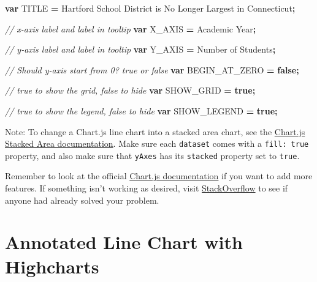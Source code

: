 \documentclass[
  english,
]{book}
\newenvironment{Shaded}{\begin{snugshade}}{\end{snugshade}}
\newcommand{\CommentTok}[1]{\textcolor[rgb]{0.56,0.35,0.01}{\textit{#1}}}
\newcommand{\KeywordTok}[1]{\textcolor[rgb]{0.13,0.29,0.53}{\textbf{#1}}}
\newcommand{\NormalTok}[1]{#1}
\newcommand{\OperatorTok}[1]{\textcolor[rgb]{0.81,0.36,0.00}{\textbf{#1}}}
\newcommand{\StringTok}[1]{\textcolor[rgb]{0.31,0.60,0.02}{#1}}
\begin{document}
\begin{Shaded}
\begin{Highlighting}[]
\KeywordTok{var}\NormalTok{ TITLE }\OperatorTok{=} \StringTok{\textquotesingle{}Hartford School District is No Longer Largest in Connecticut\textquotesingle{}}\OperatorTok{;}

\CommentTok{// x{-}axis label and label in tooltip}
\KeywordTok{var}\NormalTok{ X\_AXIS }\OperatorTok{=} \StringTok{\textquotesingle{}Academic Year\textquotesingle{}}\OperatorTok{;}

\CommentTok{// y{-}axis label and label in tooltip}
\KeywordTok{var}\NormalTok{ Y\_AXIS }\OperatorTok{=} \StringTok{\textquotesingle{}Number of Students\textquotesingle{}}\OperatorTok{;}

\CommentTok{// Should y{-}axis start from 0? \textasciigrave{}true\textasciigrave{} or \textasciigrave{}false\textasciigrave{}}
\KeywordTok{var}\NormalTok{ BEGIN\_AT\_ZERO }\OperatorTok{=} \KeywordTok{false}\OperatorTok{;}

\CommentTok{// \textasciigrave{}true\textasciigrave{} to show the grid, \textasciigrave{}false\textasciigrave{} to hide}
\KeywordTok{var}\NormalTok{ SHOW\_GRID }\OperatorTok{=} \KeywordTok{true}\OperatorTok{;}

 \CommentTok{// \textasciigrave{}true\textasciigrave{} to show the legend, \textasciigrave{}false\textasciigrave{} to hide}
\KeywordTok{var}\NormalTok{ SHOW\_LEGEND }\OperatorTok{=} \KeywordTok{true}\OperatorTok{;}
\end{Highlighting}
\end{Shaded}

Note: To change a Chart.js line chart into a stacked area chart, see the \href{https://www.chartjs.org/docs/latest/charts/line.html?h=stacked}{Chart.js Stacked Area documentation}. Make sure each \texttt{dataset} comes with a \texttt{fill:\ true} property, and also make sure that \texttt{yAxes} has its \texttt{stacked} property set to \texttt{true}.

Remember to look at the official \href{https://www.chartjs.org/docs/latest/}{Chart.js documentation} if you want to add more features. If something isn't working as desired, visit \href{https://stackoverflow.com/search?q=chartjs}{StackOverflow} to see if anyone had already solved your problem.

\hypertarget{highcharts-annotated-line}{%
\section*{Annotated Line Chart with Highcharts}\label{highcharts-annotated-line}}
\end{document}
